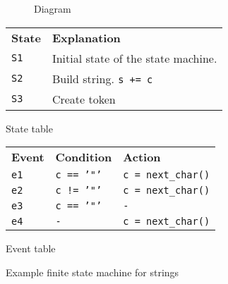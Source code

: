 \begin{figure}[H]
	\centering
    \begin{subfigure}{\textwidth}
		\centering
		\caption{Diagram}
	\end{subfigure}
	\begin{subtable}{0.45\textwidth}
		\centering
        \begin{tabular}{ l p{4.5cm} }
            \textbf{State} & \textbf{Explanation} \\
            \texttt{S1} & Initial state of the state machine. \\
            \texttt{S2} & Build string. \texttt{s += c} \\
            \texttt{S3} & Create token \\
		\end{tabular}
		\caption{State table}
	\end{subtable}
	\begin{subtable}{0.45\textwidth}
		\centering
        \begin{tabular}{ l l l }
            \textbf{Event} & \textbf{Condition} & \textbf{Action} \\
            \texttt{e1} & \texttt{c == '"'} & \texttt{c = next\_char()} \\
            \texttt{e2} & \texttt{c != '"'} & \texttt{c = next\_char()} \\
            \texttt{e3} & \texttt{c == '"'} & \texttt{-} \\
            \texttt{e4} & \texttt{-} & \texttt{c = next\_char()} \\
		\end{tabular}
		\caption{Event table}
	\end{subtable}
	\caption{Example finite state machine for strings}
    \label{fig:finite_state_strings}
\end{figure}

